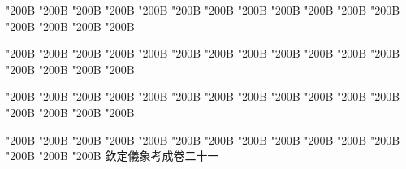 \begin{正文}
\char"200B\relax{}
\char"200B\relax{}
\char"200B\relax{}
\char"200B\relax{}
\char"200B\relax{}
\char"200B\relax{}
\char"200B\relax{}
\char"200B\relax{}
\char"200B\relax{}
\char"200B\relax{}
\char"200B\relax{}
\char"200B\relax{}
\char"200B\relax{}
\char"200B\relax{}
\char"200B\relax{}
\char"200B\relax
{}\par
\end{正文}\clearpage
{}
\begin{正文}
\char"200B\relax{}
\char"200B\relax{}
\char"200B\relax{}
\char"200B\relax{}
\char"200B\relax{}
\char"200B\relax{}
\char"200B\relax{}
\char"200B\relax{}
\char"200B\relax{}
\char"200B\relax{}
\char"200B\relax{}
\char"200B\relax{}
\char"200B\relax{}
\char"200B\relax{}
\char"200B\relax{}
\char"200B\relax
{}\par
\end{正文}\clearpage
{}
\begin{正文}
\char"200B\relax{}
\char"200B\relax{}
\char"200B\relax{}
\char"200B\relax{}
\char"200B\relax{}
\char"200B\relax{}
\char"200B\relax{}
\char"200B\relax{}
\char"200B\relax{}
\char"200B\relax{}
\char"200B\relax{}
\char"200B\relax{}
\char"200B\relax{}
\char"200B\relax{}
\char"200B\relax{}
\char"200B\relax
{}\par
\end{正文}\clearpage
{}
\begin{正文}
\char"200B\relax{}
\char"200B\relax{}
\char"200B\relax{}
\char"200B\relax{}
\char"200B\relax{}
\char"200B\relax{}
\char"200B\relax{}
\char"200B\relax{}
\char"200B\relax{}
\char"200B\relax{}
\char"200B\relax{}
\char"200B\relax{}
\char"200B\relax{}
\char"200B\relax{}
\char"200B\relax{}
欽定儀象考成卷二十一
\par

\par\end{正文}\clearpage
